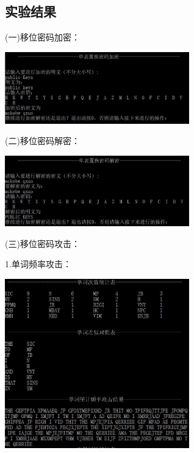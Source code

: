 \documentclass[UTF8,a4paper]{article}
\begin{document}
	\subsection{实验结果}
	
		(一)移位密码加密：\par 
	
	\begin{center}		\includegraphics[width=0.6\textwidth]{secondEncry.JPG}
	\end{center}
	
	(二)移位密码解密：\par 
	\begin{center}
		\includegraphics[width=0.6\textwidth]{secondDecry.JPG}
	\end{center}
	
	(三)移位密码攻击：\par 
	1.单词频率攻击：\par 
		\begin{center}
		\includegraphics[width=0.6\textwidth]{2attack1.JPG}
	\end{center}
\end{document}
